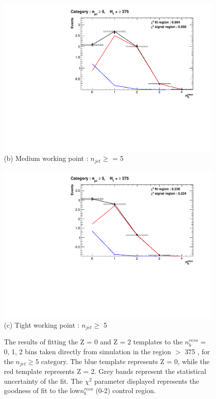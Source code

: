 \begin{figure}[ht]
\footnotesize
\centering
\begin{minipage}[b]{0.51\linewidth}
\includegraphics[width = 1.0\linewidth]{plots/ThesisPlots/Final_Fit_To_MC_Normal_Medium_HTBin_OneMuon_Template_375_jet_mult_5.pdf}
\centering (b) Medium working point : $n_{jet} \geq$ = 5 
\end{minipage}
\quad
\begin{minipage}[b]{0.51\linewidth}
\centering
\includegraphics[width = 1.0\linewidth]{plots/ThesisPlots/Final_Fit_To_MC_Normal_Tight_HTBin_OneMuon_Template_375_jet_mult_5.pdf}
\centering (c) Tight working point : $n_{jet} \geq$ 5 
\end{minipage}
\caption[The results of fitting the Z = 0 and Z = 2 templates to the $n_{b}^{reco}$ = 0, 1, 2 bins taken directly from simulation in the region \theht $>$ 375 \GeV, for the $n_{jet} \geq 5$ category.]{The results of fitting the Z = 0 and Z = 2 templates to the $n_{b}^{reco}$ = 0, 1, 2 bins taken directly from simulation in the region \theht $>$ 375 \GeV, for the $n_{jet} \geq 5$ category. The blue template represents Z = 0, while the red template represents Z = 2. Grey bands represent the statistical uncertainty of the fit. The $\chi^{2}$ parameter displayed represents the goodness of fit to the low$ n_{b}^{reco}$ (0-2) control region.}
\label{fig:template_closure_njet5}
\end{figure}

